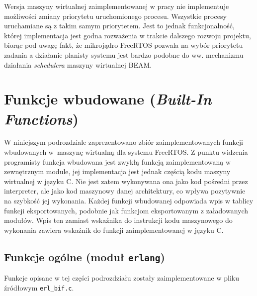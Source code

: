 Wersja maszyny wirtualnej zaimplementowanej w pracy nie implementuje możliwości zmiany priorytetu uruchomionego procesu.
Wszystkie procesy uruchamiane są z takim samym priorytetem.
Jest to jednak funkcjonalność, której implementacja jest godna rozważenia w trakcie dalszego rozwoju projektu, biorąc pod uwagę fakt, że mikrojądro FreeRTOS pozwala na wybór priorytetu zadania a działanie planisty systemu jest bardzo podobne do ww. mechanizmu działania \emph{schedulera} maszyny wirtualnej BEAM.

\section{Funkcje wbudowane (\emph{Built-In Functions})}
\label{sec:maszynaBIF}

W niniejszym podrozdziale zaprezentowano zbiór zaimplementowanych funkcji wbudowanych w~maszynę wirtualną dla systemu FreeRTOS.
Z punktu widzenia programisty funkcja wbudowana jest zwykłą funkcją zaimplementowaną w zewnętrznym module, jej implementacja jest jednak częścią kodu maszyny wirtualnej w języku C.
Nie jest zatem wykonywana ona jako kod pośredni przez interpreter, ale jako kod maszynowy danej architektury, co wpływa pozytywnie na szybkość jej wykonania.
Każdej funkcji wbudowanej odpowiada wpis w tablicy funkcji eksportowanych, podobnie jak funkcjom eksportowanym z załadowanych modułów.
Wpis ten zamiast wskaźnika do instrukcji kodu maszynowego do wykonania zawiera wskaźnik do funkcji zaimplementowanej w języku C.

\subsection{Funkcje ogólne (moduł \texttt{erlang})}
\label{sub:bifErlang}
Funkcje opisane w tej części podrozdziału zostały zaimplementowane w pliku źródłowym \texttt{erl\_bif.c}.

